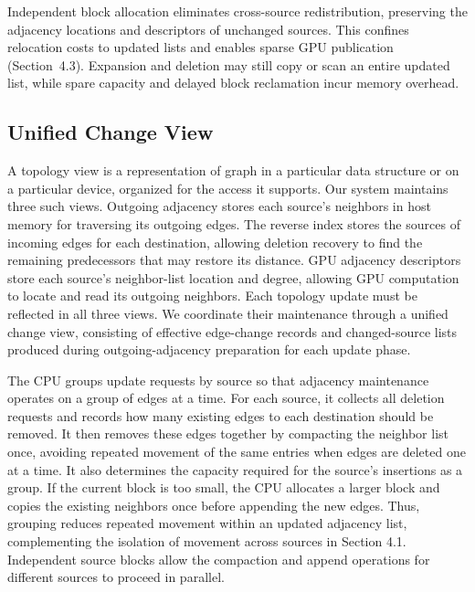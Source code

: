 
Independent block allocation eliminates cross-source redistribution, preserving the adjacency locations and descriptors of unchanged sources. This confines relocation costs to updated lists and enables sparse GPU publication (Section~4.3). Expansion and deletion may still copy or scan an entire updated list, while spare capacity and delayed block reclamation incur memory overhead.

\subsection{Unified Change View}

A topology view is a representation of graph in a particular data structure or on a particular device, organized for the access it supports. Our system maintains three such views. Outgoing adjacency stores each source's neighbors in host memory for traversing its outgoing edges. The reverse index stores the sources of incoming edges for each destination, allowing deletion recovery to find the remaining predecessors that may restore its distance. GPU adjacency descriptors store each source's neighbor-list location and degree, allowing GPU computation to locate and read its outgoing neighbors. Each topology update must be reflected in all three views. We coordinate their maintenance through a unified change view, consisting of effective edge-change records and changed-source lists produced during outgoing-adjacency preparation for each update phase.

The CPU groups update requests by source so that adjacency maintenance operates on a group of edges at a time. For each source, it collects all deletion requests and records how many existing edges to each destination should be removed. It then removes these edges together by compacting the neighbor list once, avoiding repeated movement of the same entries when edges are deleted one at a time. It also determines the capacity required for the source's insertions as a group. If the current block is too small, the CPU allocates a larger block and copies the existing neighbors once before appending the new edges. Thus, grouping reduces repeated movement within an updated adjacency list, complementing the isolation of movement across sources in Section 4.1. Independent source blocks allow the compaction and append operations for different sources to proceed in parallel.

